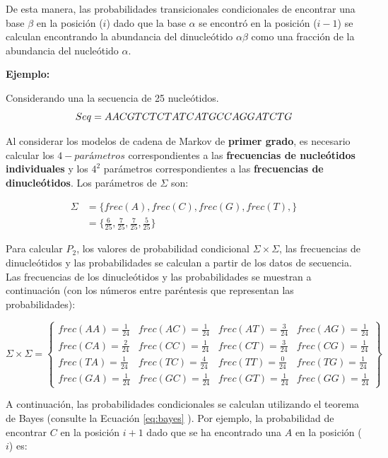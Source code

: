 \documentclass[
]{book}
\begin{document}
De esta manera, las probabilidades transicionales condicionales de encontrar una base \(\beta\) en la posición (\(i\)) dado que la base \(\alpha\) se encontró en la posición (\(i-1\)) se calculan encontrando la abundancia del dinucleótido \(\alpha\beta\) como una fracción de la abundancia del nucleótido \(\alpha\).

\textbf{Ejemplo:}

Considerando una la secuencia de 25 nucleótidos.
\[Seq = AACGT\space CTCTA\space TCATG\space CCAGG\space ATCTG\]

Al considerar los modelos de cadena de Markov de \textbf{primer grado}, es necesario calcular los \(4-parámetros\) correspondientes a las \textbf{frecuencias de nucleótidos individuales} y los \(4^2\) parámetros correspondientes a las \textbf{frecuencias de dinucleótidos}. Los parámetros de \(\Sigma\) son:

\begin{equation} 
\begin{split}
\Sigma & = \{frec(A),frec(C),frec(G),frec(T),\}\\
 & =\{\frac{6}{25},\frac{7}{25},\frac{7}{25},\frac{5}{25}\}
\end{split}
\label{eq:EQ3}
\end{equation}

Para calcular \(P_2\), los valores de probabilidad condicional \(\Sigma \times \Sigma\), las frecuencias de dinucleótidos y las probabilidades se calculan a partir de los datos de secuencia. Las frecuencias de los dinucleótidos y las probabilidades se muestran a continuación (con los números entre paréntesis que representan las probabilidades):

\begin{equation}
\Sigma \times \Sigma = 
\begin{Bmatrix}
frec(AA)=\frac{1}{24} & frec(AC)=\frac{1}{24} & frec(AT)=\frac{3}{24} & frec(AG)=\frac{1}{24} \\
frec(CA)=\frac{2}{24} & frec(CC)=\frac{1}{24} & frec(CT)=\frac{3}{24} &frec(CG)=\frac{1}{24} \\
frec(TA)=\frac{1}{24} & frec(TC)=\frac{4}{24} & frec(TT)=\frac{0}{24} & frec(TG)=\frac{1}{24} \\
frec(GA)=\frac{1}{24} & frec(GC)=\frac{1}{24} & frec(GT)=\frac{1}{24} & frec(GG)=\frac{1}{24}
\end{Bmatrix}
\label{eq:EQ4}
\end{equation}

A continuación, las probabilidades condicionales se calculan utilizando el teorema de Bayes (consulte la Ecuación \eqref{eq:bayes} ). Por ejemplo, la probabilidad de encontrar \(C\) en la posición \(i+1\) dado que se ha encontrado una \(A\) en la posición (\(i\)) es:
\end{document}
